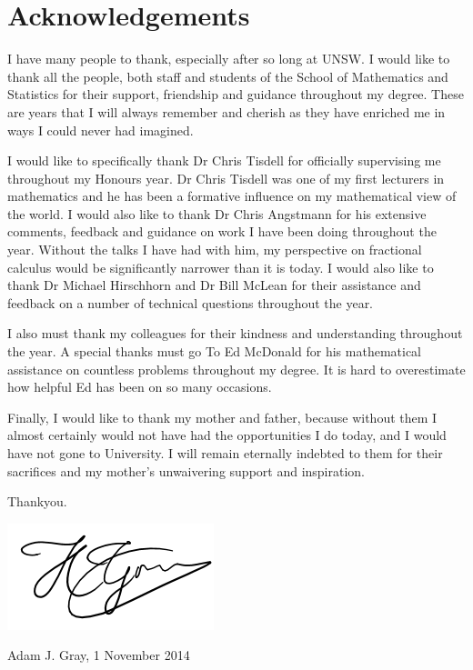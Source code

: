 \section*{Acknowledgements}

I have many people to thank, especially after so long at UNSW. I would like to thank all the people, both staff and students of the School of Mathematics and Statistics for their support, friendship and guidance throughout my degree. These are years that I will always remember and cherish as they have enriched me in ways I could never had imagined. 

I would like to specifically thank Dr Chris Tisdell for officially supervising me throughout my Honours year. Dr Chris Tisdell was one of my first lecturers in mathematics and he has been a formative influence on my mathematical view of the world. I would also like to thank Dr Chris Angstmann for his extensive comments, feedback and guidance on work I have been doing throughout the year. Without the talks I have had with him, my perspective on fractional calculus would be significantly narrower than it is today. I would also like to thank Dr Michael Hirschhorn and Dr Bill McLean for their assistance and feedback on a number of technical questions throughout the year.

I also must thank my colleagues for their kindness and understanding throughout the year. A special thanks must go To Ed McDonald for his mathematical assistance on countless problems throughout my degree. It is hard to overestimate how helpful Ed has been on so many occasions. 

Finally, I would like to thank my mother and father, because without them I almost certainly would not have had the opportunities I do today, and I would have not gone to University. I will remain eternally indebted to them for their sacrifices and my mother's unwaivering support and inspiration.

\vspace{2cm}
\begin{center}
Thankyou.
\end{center}
\vspace{2cm}

\includegraphics[scale=1.3]{images/signature}



Adam J. Gray, 1 November 2014
\clearpage
